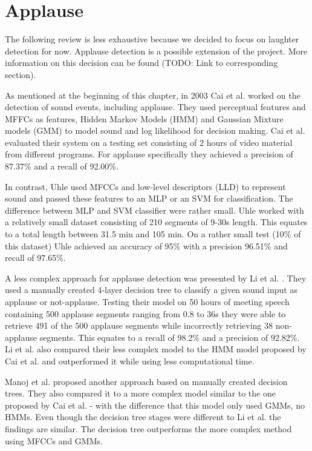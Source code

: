 \documentclass[bsc,frontabs,parskip,deptreport]{infthesis}
\begin{document}
\section{Applause}
The following review is less exhaustive because we decided to focus on laughter detection for now. Applause detection is a possible extension of the project. 
More information on this decision can be found (TODO: Link to corresponding section).

As mentioned at the beginning of this chapter, in 2003 Cai et al. \citep{cai2003highlight} worked on the detection of sound events, including applause.
They used perceptual features and MFFCs as features, Hidden Markov Models (HMM) and Gaussian Mixture models (GMM) to model sound and log likelihood for decision making.
Cai et al. evaluated their system on a testing set consisting of 2 hours of video material from different programs.
For applause specifically they achieved a precision of 87.37\% and a recall of 92.00\%.

In contrast, Uhle \citep{uhle2011applause} used MFCCs and low-level descriptors (LLD) to represent sound and passed these features to an MLP or an SVM for classification.
The difference between MLP and SVM classifier were rather small.
Uhle worked with a relatively small dataset consisting of 210 segments of 9-30s length. This equates to a total length between 31.5 min and 105 min.
On a rather small test (10\% of this dataset) Uhle achieved an accuracy of 95\% with a precision 96.51\% and recall of 97.65\%.

A less complex approach for applause detection was presented by Li et al. \citep{li2009characteristics}.
They used a manually created 4-layer decision tree to classify a given sound input as applause or not-applause.
Testing their model on 50 hours of meeting speech containing 500 applause segments ranging from 0.8 to 36s they were able to retrieve 491 of the 500 applause segments while incorrectly retrieving 38 non-applause segments.
This equates to a recall of 98.2\% and a precision of 92.82\%. Li et al. also compared their less complex model to the HMM model proposed by Cai et al.\citep{cai2003highlight} and outperformed it while using less computational time.

Manoj et al. \citep{manoj2011novel} proposed another approach based on manually created decision trees. They also compared it to a more complex model similar to the one proposed by Cai et al. \citep{cai2003highlight} - with the difference that this model only used GMMs, no HMMs.
Even though the decision tree stages were different to Li et al. \citep{li2009characteristics} the findings are similar. The decision tree outperforms the more complex method using MFCCs and GMMs.  
\end{document}
